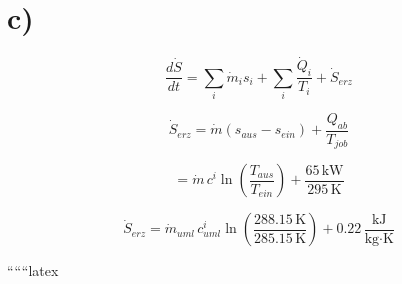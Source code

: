 

\section*{c)}

\begin{equation}
\frac{d\dot{S}}{dt} = \sum_i \dot{m}_i s_i + \sum_i \frac{\dot{Q}_i}{T_i} + \dot{S}_{erz}
\end{equation}

\begin{equation}
\dot{S}_{erz} = \dot{m} (s_{aus} - s_{ein}) + \frac{Q_{ab}}{T_{job}}
\end{equation}

\begin{equation}
= \dot{m} \, c^{i} \ln \left( \frac{T_{aus}}{T_{ein}} \right) + \frac{65 \, \text{kW}}{295 \, \text{K}}
\end{equation}

\begin{equation}
\dot{S}_{erz} = \dot{m}_{uml} \, c^{i}_{uml} \ln \left( \frac{288.15 \, \text{K}}{285.15 \, \text{K}} \right) + 0.22 \, \frac{\text{kJ}}{\text{kg} \cdot \text{K}}
\end{equation}

``````latex